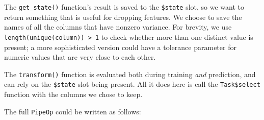 \documentclass[]{scrbook}
\newenvironment{Shaded}{\begin{snugshade}}{\end{snugshade}}
\newcommand{\ControlFlowTok}[1]{\textcolor[rgb]{0.13,0.29,0.53}{\textbf{#1}}}
\newcommand{\DataTypeTok}[1]{\textcolor[rgb]{0.13,0.29,0.53}{#1}}
\newcommand{\DecValTok}[1]{\textcolor[rgb]{0.00,0.00,0.81}{#1}}
\newcommand{\KeywordTok}[1]{\textcolor[rgb]{0.13,0.29,0.53}{\textbf{#1}}}
\newcommand{\NormalTok}[1]{#1}
\newcommand{\OperatorTok}[1]{\textcolor[rgb]{0.81,0.36,0.00}{\textbf{#1}}}
\newcommand{\StringTok}[1]{\textcolor[rgb]{0.31,0.60,0.02}{#1}}
\renewenvironment{Shaded} {\begin{snugshade}\small} {\end{snugshade}}
\begin{document}
The \texttt{get\_state()} function's result is saved to the \texttt{\$state} slot, so we want to return something that is useful for dropping features.
We choose to save the names of all the columns that have nonzero variance.
For brevity, we use \texttt{length(unique(column))\ \textgreater{}\ 1} to check whether more than one distinct value is present; a more sophisticated version could have a tolerance parameter for numeric values that are very close to each other.

The \texttt{transform()} function is evaluated both during training \emph{and} prediction, and can rely on the \texttt{\$state} slot being present.
All it does here is call the \texttt{Task\$select} function with the columns we chose to keep.

The full \texttt{PipeOp} could be written as follows:

\begin{Shaded}
\end{Shaded}
\end{document}
